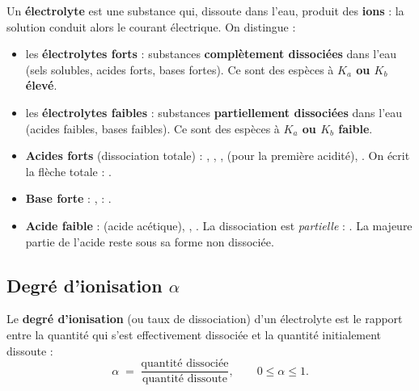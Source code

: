 \documentclass[11pt,a4paper]{article}
\begin{document}
\begin{definition}[électrolyte]
Un \textbf{électrolyte} est une substance qui, dissoute dans l'eau, produit des \textbf{ions} : la solution
conduit alors le courant électrique. On distingue :
\begin{itemize}[leftmargin=1.6em,topsep=2pt,itemsep=2pt]
  \item les \textbf{électrolytes forts} : substances \textbf{complètement dissociées} dans l'eau (sels
        solubles, acides forts, bases fortes). Ce sont des espèces à \textbf{$K_a$ ou $K_b$ élevé}.
  \item les \textbf{électrolytes faibles} : substances \textbf{partiellement dissociées} dans l'eau (acides
        faibles, bases faibles). Ce sont des espèces à \textbf{$K_a$ ou $K_b$ faible}.
\end{itemize}
\end{definition}

\begin{exemple}
\begin{itemize}[leftmargin=1.6em,topsep=2pt,itemsep=2pt]
  \item \textbf{Acides forts} (dissociation totale) : , , ,  (pour la
        première acidité), . On écrit la flèche totale : .
  \item \textbf{Base forte} : ,  : .
  \item \textbf{Acide faible} :  (acide acétique), , . La dissociation est
        \emph{partielle} : . La majeure partie de l'acide reste sous sa
        forme  non dissociée.
\end{itemize}
\end{exemple}

\subsection{Degré d'ionisation $\alpha$}

\begin{formule}
Le \textbf{degré d'ionisation} (ou taux de dissociation) d'un électrolyte est le rapport entre la quantité
qui s'est effectivement dissociée et la quantité initialement dissoute :
\[ \boxed{\alpha \;=\; \frac{\text{quantité dissociée}}{\text{quantité dissoute}}}, \qquad 0 \leq \alpha \leq 1. \]
\end{formule}
\end{document}

